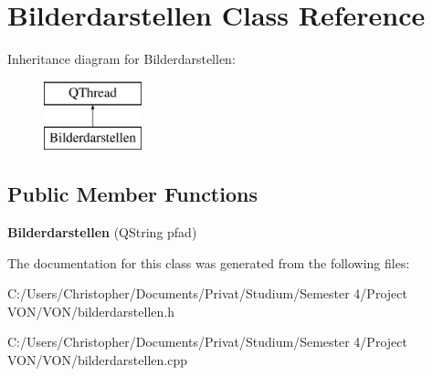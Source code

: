\hypertarget{class_bilderdarstellen}{}\section{Bilderdarstellen Class Reference}
\label{class_bilderdarstellen}
Inheritance diagram for Bilderdarstellen\+:\begin{figure}[H]
\begin{center}
\leavevmode
\includegraphics[height=2.000000cm]{class_bilderdarstellen}
\end{center}
\end{figure}
\subsection*{Public Member Functions}
\begin{DoxyCompactItemize}
\item 
{\bfseries Bilderdarstellen} (Q\+String pfad)\hypertarget{class_bilderdarstellen_a7554bef5e0b367fb30241b9f5ec70029}{}\label{class_bilderdarstellen_a7554bef5e0b367fb30241b9f5ec70029}

\end{DoxyCompactItemize}


The documentation for this class was generated from the following files\+:\begin{DoxyCompactItemize}
\item 
C\+:/\+Users/\+Christopher/\+Documents/\+Privat/\+Studium/\+Semester 4/\+Project V\+O\+N/\+V\+O\+N/bilderdarstellen.\+h\item 
C\+:/\+Users/\+Christopher/\+Documents/\+Privat/\+Studium/\+Semester 4/\+Project V\+O\+N/\+V\+O\+N/bilderdarstellen.\+cpp\end{DoxyCompactItemize}
